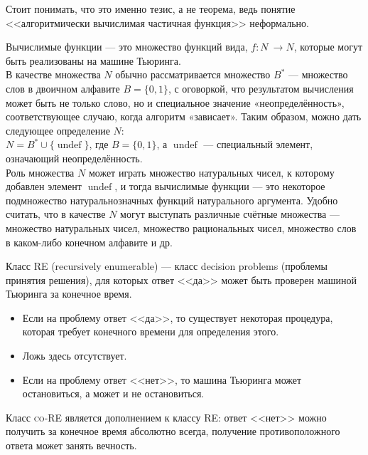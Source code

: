     \begin{Rem}
        Стоит понимать, что это именно тезис, а не теорема, ведь понятие <<алгоритмически вычислимая частичная функция>> неформально.
    \end{Rem}
    \begin{Def} 
        Вычислимые функции — это множество функций вида, $ f \colon N\ \to N $, которые могут быть реализованы на машине Тьюринга.\\
        В качестве множества $N$ обычно рассматривается множество $B^{*}$ — множество слов в двоичном алфавите $B = \{0,1\}$, с оговоркой, что результатом вычисления может быть не только слово, но и специальное значение «неопределённость», соответствующее случаю, когда алгоритм «зависает». Таким образом, можно дать следующее определение $N$:\\
        $N=B^{*}\cup \{\operatorname{undef} \}$, где $B=\{0,1\}$, а $\operatorname{undef}$ — специальный элемент, означающий неопределённость.\\
        Роль множества $N$ может играть множество натуральных чисел, к которому добавлен элемент $ \operatorname{undef} $, и тогда вычислимые функции --- это некоторое подмножество натуральнозначных функций натурального аргумента. Удобно считать, что в качестве $N$ могут выступать различные счётные множества --- множество натуральных чисел, множество рациональных чисел, множество слов в каком-либо конечном алфавите и др. 
    \end{Def}
    
    
    \begin{Def}
        Класс \textsc{RE} (recursively enumerable) --- класс decision problems (проблемы принятия решения), для которых ответ <<да>> может быть проверен машиной Тьюринга за конечное время.
        \begin{itemize}
            \item Если на проблему ответ <<да>>, то существует некоторая процедура, которая требует конечного времени для определения этого.
            \item Ложь здесь отсутствует.
            \item Если на проблему ответ <<нет>>, то машина Тьюринга может остановиться, а может и не остановиться.
        \end{itemize}
        Класс \textsc{co-RE} является дополнением к классу \textsc{RE}: ответ <<нет>> можно получить за конечное время абсолютно всегда, получение противоположного ответа может занять вечность.
    \end{Def}


